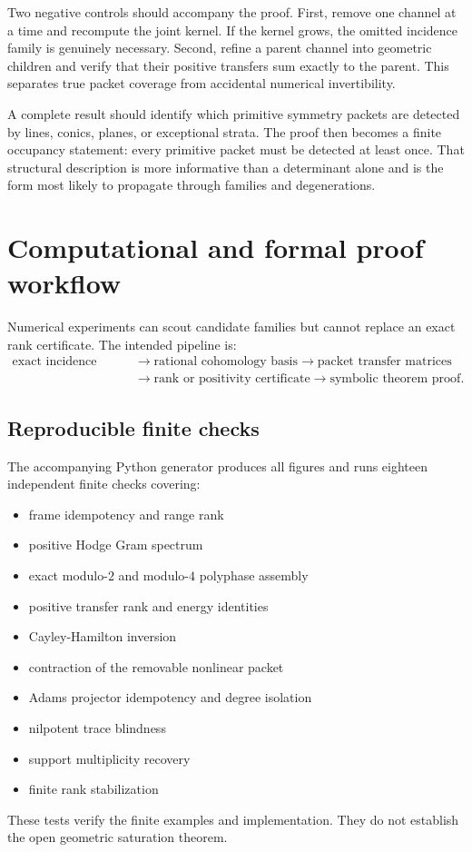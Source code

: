 Two negative controls should accompany the proof. First, remove one channel at a time and recompute the joint kernel. If the kernel grows, the omitted incidence family is genuinely necessary. Second, refine a parent channel into geometric children and verify that their positive transfers sum exactly to the parent. This separates true packet coverage from accidental numerical invertibility.

A complete result should identify which primitive symmetry packets are detected by lines, conics, planes, or exceptional strata. The proof then becomes a finite occupancy statement: every primitive packet must be detected at least once. That structural description is more informative than a determinant alone and is the form most likely to propagate through families and degenerations.

\chapter{Computational and formal proof workflow}
Numerical experiments can scout candidate families but cannot replace an exact rank certificate. The intended pipeline is:
\[
\begin{aligned}
\text{exact incidence data}
&\longrightarrow \text{rational cohomology basis}
\longrightarrow \text{packet transfer matrices}\\
&\longrightarrow \text{rank or positivity certificate}
\longrightarrow \text{symbolic theorem proof}.
\end{aligned}
\]



\section{Reproducible finite checks}
The accompanying Python generator produces all figures and runs eighteen independent finite checks covering:
\begin{itemize}
\item frame idempotency and range rank
\item positive Hodge Gram spectrum
\item exact modulo-$2$ and modulo-$4$ polyphase assembly
\item positive transfer rank and energy identities
\item Cayley-Hamilton inversion
\item contraction of the removable nonlinear packet
\item Adams projector idempotency and degree isolation
\item nilpotent trace blindness
\item support multiplicity recovery
\item finite rank stabilization
\end{itemize}
These tests verify the finite examples and implementation. They do not establish the open geometric saturation theorem.

